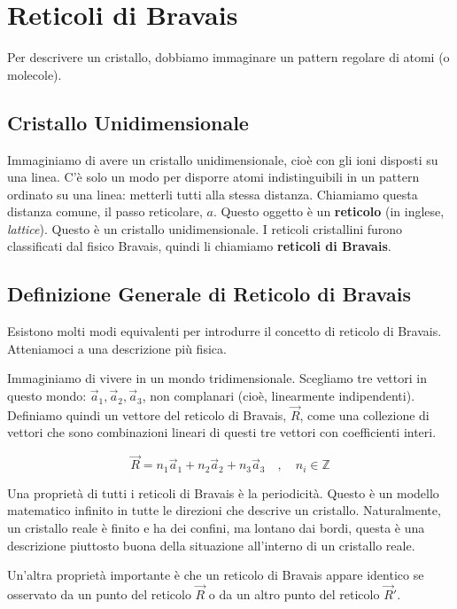 \section*{Reticoli di Bravais}

Per descrivere un cristallo, dobbiamo immaginare un pattern regolare di atomi (o molecole).

\subsection*{Cristallo Unidimensionale}

Immaginiamo di avere un cristallo unidimensionale, cioè con gli ioni disposti su una linea. C'è solo un modo per disporre atomi indistinguibili in un pattern ordinato su una linea: metterli tutti alla stessa distanza. Chiamiamo questa distanza comune, il passo reticolare, $a$. Questo oggetto è un \textbf{reticolo} (in inglese, \textit{lattice}). Questo è un cristallo unidimensionale. I reticoli cristallini furono classificati dal fisico Bravais, quindi li chiamiamo \textbf{reticoli di Bravais}.

\subsection*{Definizione Generale di Reticolo di Bravais}

Esistono molti modi equivalenti per introdurre il concetto di reticolo di Bravais. Atteniamoci a una descrizione più fisica.

Immaginiamo di vivere in un mondo tridimensionale. Scegliamo tre vettori in questo mondo: $\vec{a}_1, \vec{a}_2, \vec{a}_3$, non complanari (cioè, linearmente indipendenti). Definiamo quindi un vettore del reticolo di Bravais, $\vec{R}$, come una collezione di vettori che sono combinazioni lineari di questi tre vettori con coefficienti interi.

\begin{equation}
 \vec{R} = n_1 \vec{a}_1 + n_2 \vec{a}_2 + n_3 \vec{a}_3 \quad , \quad n_i \in \mathbb{Z}
\end{equation}

Una proprietà di tutti i reticoli di Bravais è la periodicità. Questo è un modello matematico infinito in tutte le direzioni che descrive un cristallo. Naturalmente, un cristallo reale è finito e ha dei confini, ma lontano dai bordi, questa è una descrizione piuttosto buona della situazione all'interno di un cristallo reale.

Un'altra proprietà importante è che un reticolo di Bravais appare identico se osservato da un punto del reticolo $\vec{R}$ o da un altro punto del reticolo $\vec{R}'$.

